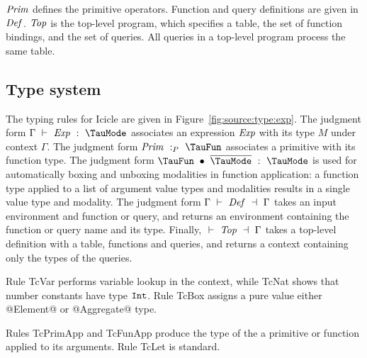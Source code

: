 $\mathit{Prim}$ defines the primitive operators.
Function and query definitions are given in $\mathit{Def}$. $\mathit{Top}$ is the top-level program, which specifies a table, the set of function bindings, and the set of queries. All queries in a top-level program process the same table.


\subsection{Type system}
The typing rules for Icicle are given in Figure~\ref{fig:source:type:exp}.
The judgment form $\Typecheck{\Gamma}{\mi{Exp}}{\TauMode}$ associates an expression $\mathit{Exp}$ with its type $M$ under context $\Gamma$.
The judgment form $\TypecheckP{\mi{Prim}}{\TauFun}$ associates a primitive with its function type.
The judgment form $\TypecheckApp{\TauFun}{\ov{\TauMode}}{\TauMode}$ is used for automatically boxing and unboxing modalities in function application: a function type applied to a list of argument value types and modalities results in a single value type and modality.
The judgment form $\TypecheckS{\Gamma}{\mi{Def}}{\Gamma}$ takes an input environment and function or query, and returns an environment containing the function or query name and its type.
Finally, $\TypecheckS{}{\mi{Top}}{\Gamma}$ takes a top-level definition with a table, functions and queries, and returns a context containing only the types of the queries.


Rule TcVar performs variable lookup in the context, while TcNat shows that number constants have type $\mathtt{Int}$. Rule TcBox assigns a pure value either @Element@ or @Aggregate@ type. 


Rules TcPrimApp and TcFunApp produce the type of the a primitive or function applied to its arguments. Rule TcLet is standard.


